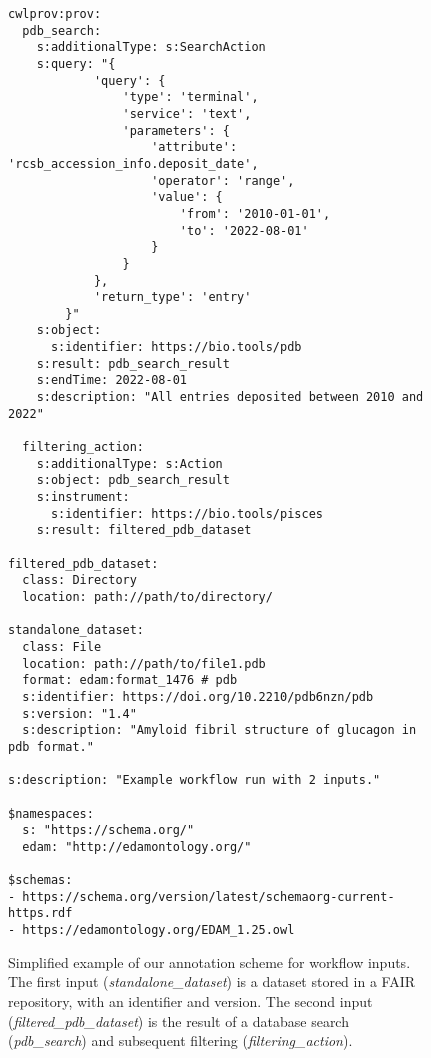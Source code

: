 \begin{figure*}[!ht]
    \centering 
    \caption{Simplified example of our annotation scheme for workflow inputs. The first input (\emph{standalone\_dataset}) is a dataset stored in a FAIR repository, with an identifier and version. The second input (\emph{filtered\_pdb\_dataset}) is the result of a database search (\emph{pdb\_search}) and subsequent filtering (\emph{filtering\_action}).}
    \begin{verbatim}
cwlprov:prov:
  pdb_search:
    s:additionalType: s:SearchAction
    s:query: "{
            'query': {
                'type': 'terminal',
                'service': 'text',
                'parameters': {
                    'attribute': 'rcsb_accession_info.deposit_date',
                    'operator': 'range',
                    'value': {
                        'from': '2010-01-01',
                        'to': '2022-08-01'
                    }
                }
            },
            'return_type': 'entry'
        }"
    s:object:
      s:identifier: https://bio.tools/pdb
    s:result: pdb_search_result
    s:endTime: 2022-08-01
    s:description: "All entries deposited between 2010 and 2022"
      
  filtering_action:
    s:additionalType: s:Action
    s:object: pdb_search_result
    s:instrument: 
      s:identifier: https://bio.tools/pisces
    s:result: filtered_pdb_dataset

filtered_pdb_dataset:
  class: Directory
  location: path://path/to/directory/
  
standalone_dataset:
  class: File
  location: path://path/to/file1.pdb
  format: edam:format_1476 # pdb
  s:identifier: https://doi.org/10.2210/pdb6nzn/pdb 
  s:version: "1.4"
  s:description: "Amyloid fibril structure of glucagon in pdb format."

s:description: "Example workflow run with 2 inputs."

$namespaces:
  s: "https://schema.org/"
  edam: "http://edamontology.org/"

$schemas:
- https://schema.org/version/latest/schemaorg-current-https.rdf
- https://edamontology.org/EDAM_1.25.owl
    \end{verbatim}
    \label{fig:ex_annotations}
\end{figure*}